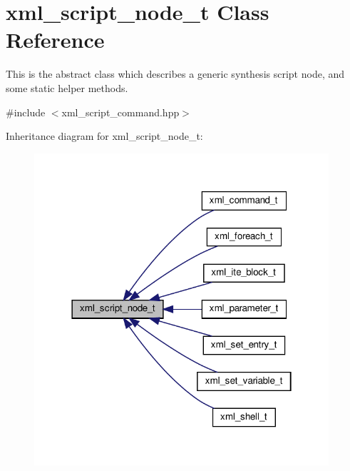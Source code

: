 \hypertarget{classxml__script__node__t}{}\section{xml\+\_\+script\+\_\+node\+\_\+t Class Reference}
\label{classxml__script__node__t}


This is the abstract class which describes a generic synthesis script node, and some static helper methods.  




{\ttfamily \#include $<$xml\+\_\+script\+\_\+command.\+hpp$>$}



Inheritance diagram for xml\+\_\+script\+\_\+node\+\_\+t\+:
\nopagebreak
\begin{figure}[H]
\begin{center}
\leavevmode
\includegraphics[width=310pt]{db/df1/classxml__script__node__t__inherit__graph}
\end{center}
\end{figure}
